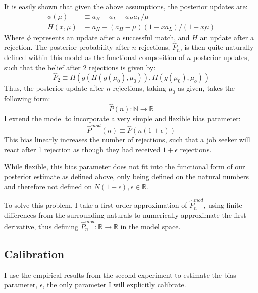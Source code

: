 \documentclass[a4paper,12pt]{article}
\begin{document}
It is easily shown that given the above assumptions, the posterior updates are:
%
\begin{align*}
  \phi(\mu) &\equiv  a_H + a_L - a_Ha_L/\mu \\
  H(x, \mu) &\equiv a_H - (a_H - \mu)(1 - xa_L)/(1 - x\mu)
\end{align*}
%
Where $\phi$ represents an update after a successful match, and $H$ an update after a rejection. The posterior probability after $n$ rejections, $\hat{P}_n$, is then quite naturally defined within this model as the functional composition of $n$ posterior updates, such that the belief after 2 rejections is given by:
$$
\hat{P}_2 \equiv H(g(H(g(\mu_0), \mu_0)), H(g(\mu_0),\mu_o))
$$
Thus, the posterior update after $n$ rejections, taking $\mu_0$ as given, takes the following form:
%
$$
\hat{P}(n): \mathbb{N} \rightarrow \mathbb{R}
$$
%
I extend the model to incorporate a very simple and flexible bias parameter:
%
$$
\hat{P}^{mod}(n) \equiv \hat{P} (n(1 + \epsilon))
$$
This bias linearly increases the number of rejections, such that a job seeker will react after 1 rejection as though they had received $1 + \epsilon$ rejections.

While flexible, this bias parameter does not fit into the functional form of our posterior estimate as defined above, only being defined on the natural numbers and therefore not defined on $N(1 + \epsilon), \epsilon \in \mathbb{R}$.

To solve this problem, I take a first-order approximation of $\hat{P}^{mod}_n$, using finite differences from the surrounding naturals to numerically approximate the first derivative, thus defining $\hat{P}^{mod}_n: \mathbb{R} \rightarrow \mathbb{R}$ in the model space.

\subsection{ Calibration }

I use the empirical results from the second experiment to estimate the bias parameter, $\epsilon$, the only parameter I will explicitly calibrate.
\end{document}
